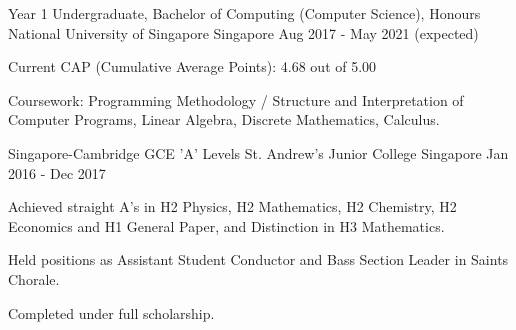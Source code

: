 

\begin{cventries}

  \cventry
    {Year 1 Undergraduate, Bachelor of Computing (Computer Science), Honours} %
    {National University of Singapore} %
    {Singapore} %
    {Aug 2017 - May 2021 (expected)} %
    {
      \begin{cvitems} %
        \item {Current CAP (Cumulative Average Points): 4.68 out of 5.00}
        \item {Coursework: Programming Methodology / Structure and Interpretation of Computer Programs, Linear Algebra, Discrete Mathematics, Calculus.}
      \end{cvitems}
    }
    
	\cventry
	{Singapore-Cambridge GCE 'A' Levels} %
	{St. Andrew's Junior College} %
	{Singapore} %
	{Jan 2016 - Dec 2017} %
	{
		\begin{cvitems} %
			\item {Achieved straight A's in H2 Physics, H2 Mathematics, H2 Chemistry, H2 Economics and H1 General Paper, and Distinction in H3 Mathematics.}
			\item {Held positions as Assistant Student Conductor and Bass Section Leader in Saints Chorale.}
			\item {Completed under full scholarship.}
		\end{cvitems}
	}
    


\end{cventries}
